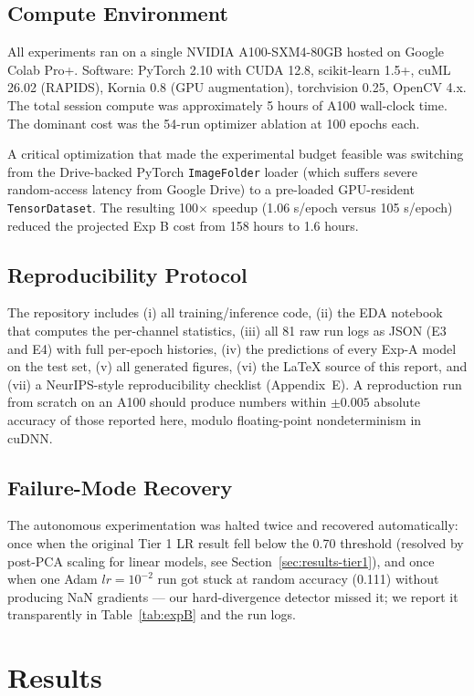 \documentclass[10pt,letterpaper]{article}
\begin{document}
\subsection{Compute Environment}
All experiments ran on a single NVIDIA A100-SXM4-80GB hosted on Google Colab Pro+. Software: PyTorch 2.10 with CUDA 12.8, scikit-learn 1.5+, cuML 26.02 (RAPIDS), Kornia 0.8 (GPU augmentation), torchvision 0.25, OpenCV 4.x. The total session compute was approximately 5 hours of A100 wall-clock time. The dominant cost was the 54-run optimizer ablation at 100 epochs each.

A critical optimization that made the experimental budget feasible was switching from the Drive-backed PyTorch \texttt{ImageFolder} loader (which suffers severe random-access latency from Google Drive) to a pre-loaded GPU-resident \texttt{TensorDataset}. The resulting 100$\times$ speedup (1.06 s/epoch versus 105 s/epoch) reduced the projected Exp B cost from 158 hours to 1.6 hours.

\subsection{Reproducibility Protocol}
The repository includes (i) all training/inference code, (ii) the EDA notebook that computes the per-channel statistics, (iii) all 81 raw run logs as JSON (E3 and E4) with full per-epoch histories, (iv) the predictions of every Exp-A model on the test set, (v) all generated figures, (vi) the LaTeX source of this report, and (vii) a NeurIPS-style reproducibility checklist (Appendix~E). A reproduction run from scratch on an A100 should produce numbers within $\pm 0.005$ absolute accuracy of those reported here, modulo floating-point nondeterminism in cuDNN.

\subsection{Failure-Mode Recovery}
The autonomous experimentation was halted twice and recovered automatically: once when the original Tier 1 LR result fell below the 0.70 threshold (resolved by post-PCA scaling for linear models, see Section~\ref{sec:results-tier1}), and once when one Adam $lr{=}10^{-2}$ run got stuck at random accuracy (0.111) without producing NaN gradients --- our hard-divergence detector missed it; we report it transparently in Table~\ref{tab:expB} and the run logs.

\section{Results}
\label{sec:results}
\end{document}
